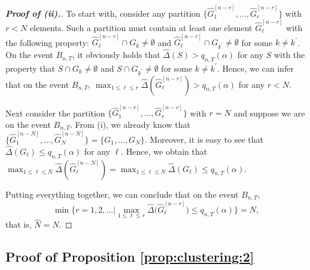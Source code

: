 \begin{proof}[\textnormal{\textbf{Proof of (ii).}}]
To start with, consider any partition $\{ \widehat{G}_1^{[n-r]},\ldots,\widehat{G}_r^{[n-r]} \}$ with $r < N$ elements. Such a partition must contain at least one element $\widehat{G}_\ell^{[n-r]}$ with the following property: $\widehat{G}_\ell^{[n-r]} \cap G_k \ne \emptyset$ and $\widehat{G}_\ell^{[n-r]} \cap G_{k^\prime} \ne \emptyset$ for some $k \ne k^\prime$. On the event $B_{n,T}$, it obviously holds that $\widehat{\Delta}(S) > q_{n,T}(\alpha)$ for any $S$ with the property that $S \cap G_k \ne \emptyset$ and $S \cap G_{k^\prime} \ne \emptyset$ for some $k \ne k^\prime$. Hence, we can infer that on the event $B_{n,T}$, $\max_{1 \le \ell \le r} \widehat{\Delta} ( \widehat{G}_\ell^{[n-r]} ) > q_{n,T}(\alpha)$ for any $r < N$. 

Next consider the partition $\{ \widehat{G}_1^{[n-r]},\ldots,\widehat{G}_r^{[n-r]} \}$ with $r = N$ and suppose we are on the event $B_{n,T}$. From (i), we already know that $\{ \widehat{G}_1^{[n-N]},\ldots,\widehat{G}_N^{[n-N]} \} =\{ G_1,\ldots,G_N \}$. Moreover, it is easy to see that $\widehat{\Delta}(G_\ell) \le q_{n,T}(\alpha)$ for any $\ell$. Hence, we obtain that $\max_{1 \le \ell \le N} \widehat{\Delta} ( \widehat{G}_\ell^{[n-N]} ) = \max_{1 \le \ell \le N} \widehat{\Delta} (G_\ell) \le q_{n,T}(\alpha)$.

Putting everything together, we can conclude that on the event $B_{n,T}$, 
\[ \min \Big\{ r = 1,2,\ldots \Big| \max_{1 \le \ell \le r} \widehat{\Delta} \big( \widehat{G}_\ell^{[n-r]} \big) \le q_{n,T}(\alpha) \Big\} = N, \]
that is, $\widehat{N} = N$. 
\end{proof}



\subsection*{Proof of Proposition \ref{prop:clustering:2}}


